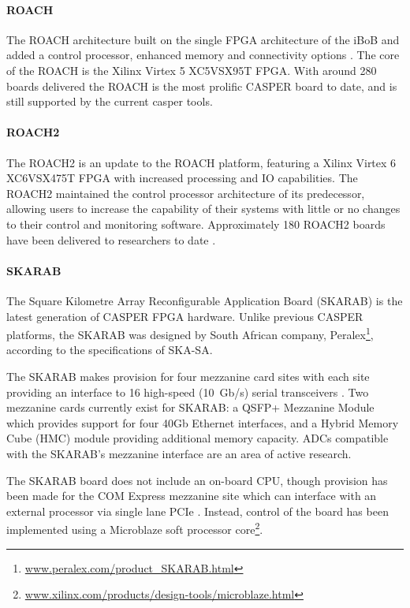\documentclass{ws-jai}
\begin{document}
\paragraph*{ROACH}
The ROACH architecture built on the single FPGA architecture of the iBoB and added a control processor, enhanced memory and connectivity options \citep{Casp09}. The core of the ROACH is the Xilinx Virtex 5 XC5VSX95T FPGA. With around 280 boards delivered \citep{private-mo} the ROACH is the most prolific CASPER board to date, and is still supported by the current casper tools.
\paragraph*{ROACH2}
The ROACH2 is an update to the ROACH platform, featuring a Xilinx Virtex 6 XC6VSX475T FPGA with increased processing and IO capabilities. The ROACH2 maintained the control processor architecture of its predecessor, allowing users to increase the capability of their systems with little or no changes to their control and monitoring software. Approximately 180 ROACH2 boards have been delivered to researchers to date \citep{private-mo}.
\paragraph*{SKARAB}
The Square Kilometre Array Reconfigurable Application Board (SKARAB) is the latest generation of CASPER FPGA hardware. Unlike previous CASPER platforms, the SKARAB was designed by South African company, Peralex\footnote{\url{www.peralex.com/product_SKARAB.html}}, according to the specifications of SKA-SA.

The SKARAB makes provision for four mezzanine card sites with each site providing an interface to 16 high-speed (10~Gb/s) serial transceivers \citep{cliff16}.
Two mezzanine cards currently exist for SKARAB: a QSFP+ Mezzanine Module which provides support for four 40Gb Ethernet interfaces, and a Hybrid Memory Cube (HMC) module providing additional memory capacity. ADCs compatible with the SKARAB's mezzanine interface are an area of active research.

The SKARAB board does not include an on-board CPU, though provision has been made for the COM Express mezzanine site which can interface with an external processor via single lane PCIe \citep{Teag15}. Instead, control of the board has been implemented using a Microblaze soft processor core\footnote{\url{www.xilinx.com/products/design-tools/microblaze.html}}.
\end{document}
